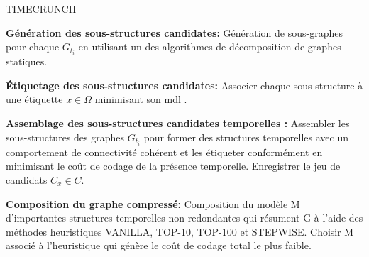 			 \begin{algorithm}
					\caption{TIMECRUNCH}
				\begin{algorithmic} [1]
					\STATE \textbf{Génération des sous-structures candidates: }Génération de sous-graphes pour chaque $G_{t_{i}}$ en utilisant un des algorithmes de décomposition de graphes statiques.
					
					
					\STATE  \textbf{Étiquetage des sous-structures candidates: }Associer chaque sous-structure à une étiquette $x \in \Omega$ minimisant son \gls{mdl} .
					
					\STATE  \textbf{Assemblage des sous-structures candidates temporelles :} Assembler les sous-structures des graphes $G_{t_{i}}$ pour former des structures temporelles avec un comportement de connectivité cohérent et les étiqueter conformément en minimisant le coût de codage de la présence temporelle. Enregistrer le jeu de candidats $C_{x} \in C $.
					
					\STATE \textbf{Composition du graphe compressé: }Composition du modèle M d'importantes structures temporelles non redondantes qui résument G à l'aide des méthodes heuristiques VANILLA, TOP-10, TOP-100 et STEPWISE. Choisir M associé à l'heuristique qui génère le coût de codage total le plus faible.
				\end{algorithmic}
			\end{algorithm}
			 
			 
			 
			 
			 
			 
			 
			 
			 
			 
			 
			 